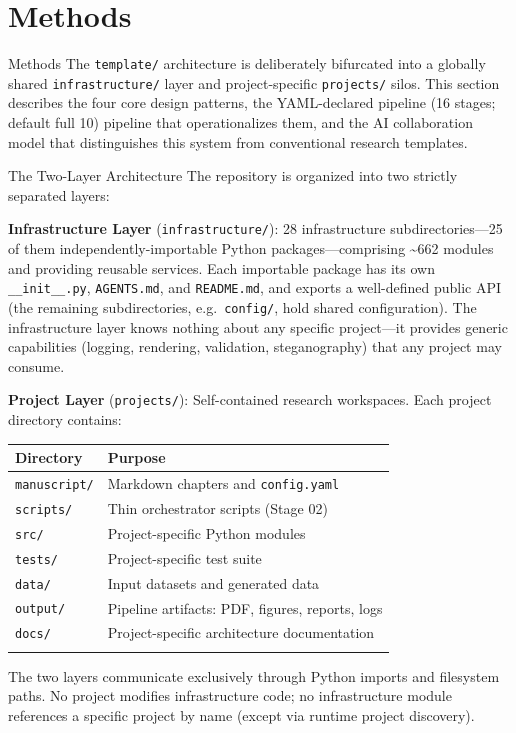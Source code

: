 \documentclass[
  ignorenonframetext,
]{beamer}
\author{\texorpdfstring{}{}}
\date{}
\newcounter{none} %
\begin{document}
\section{Methods}\label{methods}

\begin{frame}{Methods}
The \texttt{template/} architecture is deliberately bifurcated into a
globally shared \texttt{infrastructure/} layer and project-specific
\texttt{projects/} silos. This section describes the four core design
patterns, the YAML-declared pipeline (16 stages; default full 10)
pipeline that operationalizes them, and the AI collaboration model that
distinguishes this system from conventional research templates.
\end{frame}

\begin{frame}{The Two-Layer Architecture}
\protect{}\label{the-two-layer-architecture}
The repository is organized into two strictly separated layers:

\textbf{Infrastructure Layer} (\texttt{infrastructure/}): 28
infrastructure subdirectories---25 of them independently-importable
Python packages---comprising \textasciitilde662 modules and providing
reusable services. Each importable package has its own
\texttt{\_\_init\_\_.py}, \texttt{AGENTS.md}, and \texttt{README.md},
and exports a well-defined public API (the remaining subdirectories,
e.g.~\texttt{config/}, hold shared configuration). The infrastructure
layer knows nothing about any specific project---it provides generic
capabilities (logging, rendering, validation, steganography) that any
project may consume.

\textbf{Project Layer} (\texttt{projects/}): Self-contained research
workspaces. Each project directory contains:

{\def\LTcaptype{none} %
\begin{longtable}[]{@{}ll@{}}
\toprule\noalign{}
Directory & Purpose \\
\midrule\noalign{}
\endhead
\texttt{manuscript/} & Markdown chapters and \texttt{config.yaml} \\
\texttt{scripts/} & Thin orchestrator scripts (Stage 02) \\
\texttt{src/} & Project-specific Python modules \\
\texttt{tests/} & Project-specific test suite \\
\texttt{data/} & Input datasets and generated data \\
\texttt{output/} & Pipeline artifacts: PDF, figures, reports, logs \\
\texttt{docs/} & Project-specific architecture documentation \\
\bottomrule\noalign{}
\end{longtable}
}

The two layers communicate exclusively through Python imports and
filesystem paths. No project modifies infrastructure code; no
infrastructure module references a specific project by name (except via
runtime project discovery).
\end{frame}
\end{document}
